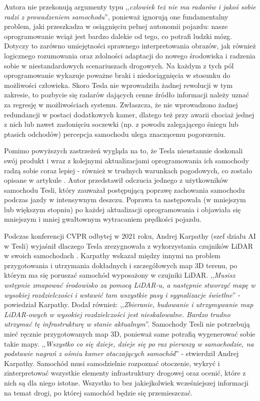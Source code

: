 Autora nie przekonują argumenty typu ,,\textit{człowiek też nie ma radarów i jakoś sobie radzi z prowadzeniem samochodu}'', ponieważ ignorują one fundamentalny problem, jaki przeszkadza w osiągnięciu pełnej autonomii pojazdu: nasze oprogramowanie wciąż jest bardzo dalekie od tego, co potrafi ludzki mózg. Dotyczy to zarówno umiejętności sprawnego interpretowania obrazów, jak również logicznego rozumowania oraz zdolności adaptacji do nowego środowiska i radzenia sobie w niestandardowych scenariuszach drogowych. Na każdym z tych pól oprogramowanie wykazuje poważne braki i niedociągnięcia w stosunku do możliwości człowieka. Skoro Tesla nie wprowadziła żadnej rewolucji w tym zakresie, to pozbycie się radarów dających cenne źródło informacji należy uznać za regresję w możliwościach systemu. Zwłaszcza, że nie wprowadzono żadnej redundancji w postaci dodatkowych kamer, dlatego też przy awarii chociaż jednej z nich lub nawet zasłonięciu soczewki (np. z powodu zalegającego śniegu lub ptasich odchodów) percepcja samochodu ulega znaczącemu pogorszeniu.

Pomimo powyższych zastrzeżeń wygląda na to, że Tesla nieustannie doskonali swój produkt i wraz z kolejnymi aktualizacjami oprogramowania ich samochody radzą sobie coraz lepiej - również w trudnych warunkach pogodowych, co zostało opisane w artykule \cite{klender:teslaOnHeavyRain}. Autor przedstawił odczucia jednego z użytkowników samochodu Tesli, który zauważał postępującą poprawę zachowania samochodu podczas jazdy w intensywnym deszczu. Poprawa ta następowała (w mniejszym lub większym stopniu) po każdej aktualizacji oprogramowania i objawiała się mniejszym i mniej gwałtownym wytracaniem prędkości pojazdu.

Podczas konferencji CVPR odbytej w 2021 roku, Andrej Karpathy (szef działu AI w Tesli) wyjaśnił dlaczego Tesla zrezygnowała z wykorzystania czujników LiDAR w swoich samochodach \cite{dickson:teslaDontNeedLidar}. Karpathy wskazał między innymi na problem przygotowania i utrzymania dokładnych i szczegółowych map 3D terenu, po którym ma się poruszać samochód wyposażony w czujniki LiDAR. ,,\textit{Musisz wstępnie zmapować środowisko za pomocą LiDAR-u, a następnie stworzyć mapę w wysokiej rozdzielczości i wstawić tam wszystkie pasy i sygnalizacje świetlne}'' - powiedział Karpathy. Dodał również: ,,\textit{Zbieranie, budowanie i utrzymywanie map LiDAR-owych w wysokiej rozdzielczości jest nieskalowalne. Bardzo trudno utrzymać tę infrastrukturę w stanie aktualnym}''. Samochody Tesli nie potrzebują mieć ręcznie przygotowanych map 3D, ponieważ same potrafią wygenerować sobie takie mapy. ,,\textit{Wszystko co się dzieje, dzieje się po raz pierwszy w samochodzie, na podstawie nagrań z ośmiu kamer otaczających samochód}'' - stwierdził Andrej Karpathy. Samochód musi samodzielnie rozpoznać otoczenie, wykryć i zinterpretować wszystkie elementy infrastruktury drogowej oraz ocenić, które z nich są dla niego istotne. Wszystko to bez jakiejkolwiek wcześniejszej informacji na temat drogi, po której samochód będzie się przemieszczać.

